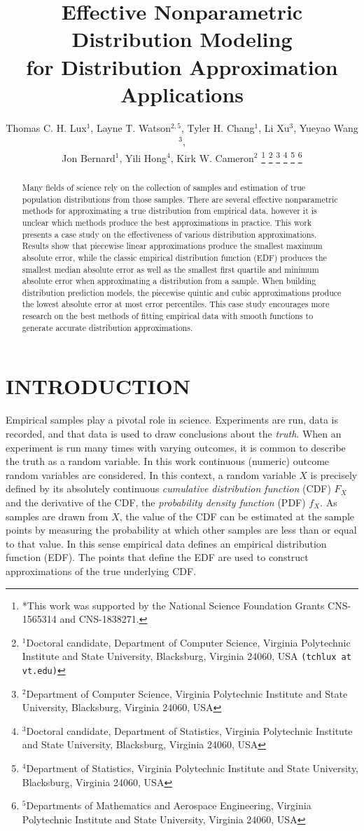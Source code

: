 \documentclass[letterpaper, 10 pt, conference]{ieeeconf}  %
\title{\LARGE \bf Effective Nonparametric Distribution Modeling \\ for Distribution Approximation Applications }
\author{Thomas C. H. Lux$^{1}$, Layne T. Watson$^{2,5}$, Tyler H. Chang$^{1}$, Li Xu$^{3}$, Yueyao Wang$^{3}$,\\ Jon Bernard$^{1}$, Yili Hong$^{4}$, Kirk W. Cameron$^{2}$%
\thanks{*This work was supported by the National Science Foundation Grants CNS-1565314 and CNS-1838271.}%
\thanks{$^{1}$Doctoral candidate, Department of Computer Science, Virginia Polytechnic Institute and State University, Blacksburg, Virginia 24060, USA {\tt\small (tchlux at vt.edu)}}%
\thanks{$^{2}$Department of Computer Science, Virginia Polytechnic Institute and State University, Blacksburg, Virginia 24060, USA}%
\thanks{$^{3}$Doctoral candidate, Department of Statistics, Virginia Polytechnic Institute and State University, Blacksburg, Virginia 24060, USA}%
\thanks{$^{4}$Department of Statistics, Virginia Polytechnic Institute and State University, Blacksburg, Virginia 24060, USA}%
\thanks{$^{5}$Departments of Mathematics and Aerospace Engineering, Virginia Polytechnic Institute and State University, Virginia 24060, USA}%
}
\begin{document}
\maketitle
\thispagestyle{empty}
\pagestyle{empty}

\begin{abstract}

Many fields of science rely on the collection of samples and estimation of true population distributions from those samples. There are several effective nonparametric methods for approximating a true distribution from empirical data, however it is unclear which methods produce the best approximations in practice. This work presents a case study on the effectiveness of various distribution approximations. Results show that piecewise linear approximations produce the smallest maximum absolute error, while the classic empirical distribution function (EDF) produces the smallest median absolute error as well as the smallest first quartile and minimum absolute error when approximating a distribution from a sample. When building distribution prediction models, the piecewise quintic and cubic approximations produce the lowest absolute error at most error percentiles. This case study encourages more research on the best methods of fitting empirical data with smooth functions to generate accurate distribution approximations.

\end{abstract}

\section{INTRODUCTION}
\label{sec:introduction}

Empirical samples play a pivotal role in science. Experiments are run, data is recorded, and that data is used to draw conclusions about the \textit{truth}. When an experiment is run many times with varying outcomes, it is common to describe the truth as a random variable. In this work continuous (numeric) outcome random variables are considered. In this context, a random variable $X$ is precisely defined by its absolutely continuous \textit{cumulative distribution function} (CDF) $F_X$ and the derivative of the CDF, the \textit{probability density function} (PDF) $f_X$. As samples are drawn from $X$, the value of the CDF can be estimated at the sample points by measuring the probability at which other samples are less than or equal to that value. In this sense empirical data defines an empirical distribution function (EDF). The points that define the EDF are used to construct approximations of the true underlying CDF.
\end{document}
